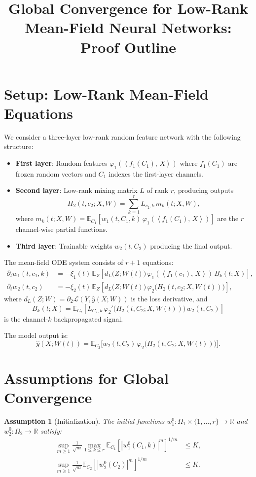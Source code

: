\documentclass[11pt]{article}
\title{Global Convergence for Low-Rank Mean-Field Neural Networks: Proof Outline}
\author{ }
\date{}
\newcommand{\E}{\mathbb{E}}
\newcommand{\R}{\mathbb{R}}
\newcommand{\1}{\mathbbm{1}}
\newcommand{\ip}[2]{\left\langle #1,\,#2 \right\rangle}
\newtheorem{assumption}{Assumption}
\begin{document}
\maketitle

\section{Setup: Low-Rank Mean-Field Equations}

We consider a three-layer low-rank random feature network with the following structure:
\begin{itemize}
\item \textbf{First layer}: Random features $\varphi_1(\ip{f_1(C_1)}{X})$ where $f_1(C_1)$ are frozen random vectors and $C_1$ indexes the first-layer channels.
\item \textbf{Second layer}: Low-rank mixing matrix $L$ of rank $r$, producing outputs
\[
H_2(t,c_2;X,W)=\sum_{k=1}^r L_{c_2,k}\,m_k(t;X,W),
\]
where $m_k(t;X,W)=\E_{C_1}[w_1(t,C_1,k)\,\varphi_1(\ip{f_1(C_1)}{X})]$ are the $r$ channel-wise partial functions.
\item \textbf{Third layer}: Trainable weights $w_2(t,C_2)$ producing the final output.
\end{itemize}

The mean-field ODE system consists of $r+1$ equations:
\begin{align}
\partial_t w_1(t,c_1,k) &= -\xi_1(t)\,\E_{Z}\!\left[d_L\big(Z;W(t)\big)\,\varphi_1\!\left(\ip{f_1(c_1)}{X}\right)\,B_k(t;X)\right], \label{eq:ode-w1}\\
\partial_t w_2(t,c_2) &= -\xi_2(t)\,\E_{Z}\!\left[d_L\big(Z;W(t)\big)\,\varphi_2\!\Big(H_2(t,c_2;X,W(t))\Big)\right], \label{eq:ode-w2}
\end{align}
where $d_L(Z;W)=\partial_2 \mathcal{L}(Y,\hat y(X;W))$ is the loss derivative, and
\[
B_k(t;X)=\E_{C_2}\!\left[L_{C_2,k}\,\varphi_2'\!\Big(H_2(t,C_2;X,W(t))\Big)\,w_2(t,C_2)\right]
\]
is the channel-$k$ backpropagated signal.

The model output is:
\[
\hat y(X;W(t)) = \E_{C_2}\big[w_2(t,C_2)\,\varphi_2\big(H_2(t,C_2;X,W(t))\big)\big].
\]

\section{Assumptions for Global Convergence}

\begin{assumption}[Initialization]\label{assump:init-lowrank}
The initial functions $w_1^0:\Omega_1\times\{1,\dots,r\}\to\R$ and $w_2^0:\Omega_2\to\R$ satisfy:
\begin{align*}
\sup_{m\ge 1}\frac{1}{\sqrt{m}}\max_{1\le k\le r}\E_{C_1}\!\left[|w_1^0(C_1,k)|^m\right]^{1/m} &\le K,\\
\sup_{m\ge 1}\frac{1}{\sqrt{m}}\E_{C_2}\!\left[|w_2^0(C_2)|^m\right]^{1/m} &\le K.
\end{align*}
\end{assumption}
\end{document}
